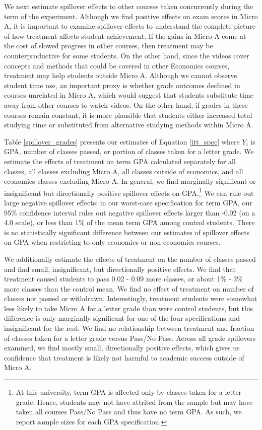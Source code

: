\documentclass[12pt]{article}
\begin{document}
We next estimate spillover effects to other courses taken concurrently during the term of the experiment. Although we find positive effects on exam scores in Micro A, it is important to examine spillover effects to understand the complete picture of how treatment affects student achievement. If the gains in Micro A come at the cost of slowed progress in other courses, then treatment may be counterproductive for some students. On the other hand, since the videos cover concepts and methods that could be covered in other Economics courses, treatment may help students outside Micro A. Although we cannot observe student time use, an important proxy is whether grade outcomes declined in courses unrelated in Micro A, which would suggest that students substitute time away from other courses to watch videos. On the other hand, if grades in these courses remain constant, it is more plausible that students either increased total studying time or substituted from alternative studying methods within Micro A.

Table \ref{spillover_grades} presents our estimates of Equation \ref{itt_spec} where $Y_i$ is GPA, number of classes passed, or portion of classes taken for a letter grade. We estimate the effects of treatment on term GPA calculated separately for all classes, all classes excluding Micro A, all classes outside of economics, and all economics classes excluding Micro A. In general, we find marginally significant or insignificant but directionally positive spillover effects on GPA.\footnote{At this university, term GPA is affected only by classes taken for a letter grade. Hence, students may not have attrited from the sample but may have taken all courses Pass/No Pass and thus have no term GPA. As such, we report sample sizes for each GPA specification.} We can rule out large negative spillover effects: in our worst-case specification for term GPA, our 95\% confidence interval rules out negative spillover effects larger than -0.02 (on a 4.0 scale), or less than 1\% of the mean term GPA among control students. There is no statistically significant difference between our estimates of spillover effects on GPA when restricting to only economics or non-economics courses.

We additionally estimate the effects of treatment on the number of classes passed and find small, insignificant, but directionally positive effects. We find that treatment caused students to pass 0.02 - 0.09 more classes, or about 1\% - 3\% more classes than the control mean. We find no effect of treatment on number of classes not passed or withdrawn. Interestingly, treatment students were somewhat less likely to take Micro A for a letter grade than were control students, but this difference is only marginally significant for one of the four specifications and insignificant for the rest. We find no relationship between treatment and fraction of classes taken for a letter grade versus Pass/No Pass. Across all grade spillovers examined, we find mostly small, directionally positive effects, which gives us confidence that treatment is likely not harmful to academic success outside of Micro A.
\end{document}
